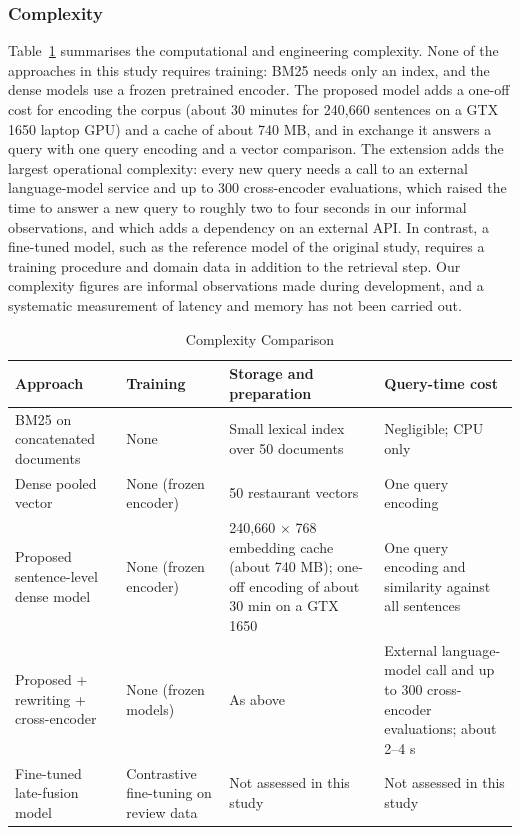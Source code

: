 \subsubsection{Complexity}
\label{sec:disccomplexity}

Table~\ref{tab:disccomplexity} summarises the computational and engineering complexity. None of the approaches in this study requires training: BM25 needs only an index, and the dense models use a frozen pretrained encoder. The proposed model adds a one-off cost for encoding the corpus (about 30 minutes for 240,660 sentences on a GTX 1650 laptop GPU) and a cache of about 740 MB, and in exchange it answers a query with one query encoding and a vector comparison. The extension adds the largest operational complexity: every new query needs a call to an external language-model service and up to 300 cross-encoder evaluations, which raised the time to answer a new query to roughly two to four seconds in our informal observations, and which adds a dependency on an external API. In contrast, a fine-tuned model, such as the reference model of the original study, requires a training procedure and domain data in addition to the retrieval step. Our complexity figures are informal observations made during development, and a systematic measurement of latency and memory has not been carried out.

\begin{table}[htbp]
\centering
\caption{Complexity Comparison}
\label{tab:disccomplexity}
\small
\begin{tabular}{|p{}|p{}|p{}|p{}|}
\hline
\textbf{Approach} & \textbf{Training} & \textbf{Storage and preparation} & \textbf{Query-time cost} \\
\hline
BM25 on concatenated documents & None & Small lexical index over 50 documents & Negligible; CPU only \\
\hline
Dense pooled vector & None (frozen encoder) & 50 restaurant vectors & One query encoding \\
\hline
Proposed sentence-level dense model & None (frozen encoder) & 240,660 $\times$ 768 embedding cache (about 740 MB); one-off encoding of about 30 min on a GTX 1650 & One query encoding and similarity against all sentences \\
\hline
Proposed + rewriting + cross-encoder & None (frozen models) & As above & External language-model call and up to 300 cross-encoder evaluations; about 2--4 s \\
\hline
Fine-tuned late-fusion model \citep{abdollahpour2023} & Contrastive fine-tuning on review data & Not assessed in this study & Not assessed in this study \\
\hline
\end{tabular}
\end{table}

